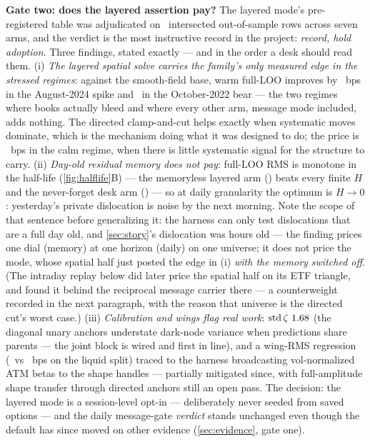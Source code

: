\documentclass[11pt]{article}
\begin{document}
\textbf{Gate two: does the layered assertion pay?}  The layered mode's
pre-registered table was adjudicated on \gtpcamppairs\ intersected
out-of-sample rows across seven arms, and the verdict is the most
instructive record in the project: \emph{record, hold adoption}.  Three
findings, stated exactly --- and in the order a desk should read them.
(i) \emph{The layered spatial solve carries the family's only measured
edge in the stressed regimes}: against the smooth-field base, warm
full-LOO improves by \gtpstressspike\ bps in the August-2024 spike and
\gtpstresshigh\ in the October-2022 bear --- the two regimes where books
actually bleed and where every other arm, message mode included, adds
nothing.  The directed clamp-and-cut helps exactly when systematic moves
dominate, which is the mechanism doing what it was designed to do; the
price is \gtpcalmcost\ bps in the calm regime, when there is little
systematic signal for the structure to carry.  (ii) \emph{Day-old
residual memory does not pay}: full-LOO RMS is monotone in the half-life
(\cref{fig:halflife}B) --- the memoryless layered arm
(\gtpcampmemoryless) beats every finite $H$ and the never-forget desk arm
(\gtpcampdesk) --- so at daily granularity the optimum is $H\to0$:
yesterday's private dislocation is noise by the next morning.  Note the
scope of that sentence before generalizing it: the harness can only test
dislocations that are a full day old, and \cref{sec:story}'s dislocation
was hours old --- the finding prices one dial (memory) at one horizon
(daily) on one universe; it does not price the mode, whose spatial half
just posted the edge in (i) \emph{with the memory switched off}.  (The
intraday replay below did later price the spatial half on its ETF
triangle, and found it behind the reciprocal message carrier there ---
a counterweight recorded in the next paragraph, with the reason that
universe is the directed cut's worst case.)
(iii) \emph{Calibration and wings flag real work}:
$\operatorname{std}\zeta\ 1.68$ (the diagonal unary anchors
understate dark-node variance when predictions share parents --- the
joint block is wired and first in line), and a wing-RMS regression
(\gtpwingliquid\ vs \gtpwingliquidtransport\ bps on the liquid split)
traced to the harness broadcasting vol-normalized ATM betas to the shape
handles --- partially mitigated since, with full-amplitude shape transfer
through directed anchors still an open pass.  The decision: the layered
mode is a
session-level opt-in --- deliberately never seeded from saved options ---
and the daily message-gate \emph{verdict} stands unchanged even though
the default has since moved on other evidence (\cref{sec:evidence},
gate one).
\end{document}
